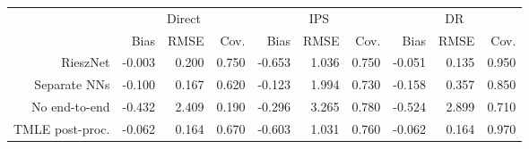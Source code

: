 \begin{tabular}{*{10}{r}} 
\toprule 
& \multicolumn{3}{c}{Direct} & \multicolumn{3}{c}{IPS} & \multicolumn{3}{c}{DR} \\ 
\cmidrule(lr){2-4} \cmidrule(lr){5-7} \cmidrule(lr){8-10} 
&  Bias &  RMSE &  Cov. &  Bias &  RMSE &  Cov. &  Bias &  RMSE &  Cov. \\ 
\midrule 
RieszNet & -0.003 & 0.200 & 0.750 & -0.653 & 1.036 & 0.750 & -0.051 & 0.135 & 0.950 \\ 
Separate NNs & -0.100 & 0.167 & 0.620 & -0.123 & 1.994 & 0.730 & -0.158 & 0.357 & 0.850 \\ 
No end-to-end & -0.432 & 2.409 & 0.190 & -0.296 & 3.265 & 0.780 & -0.524 & 2.899 & 0.710 \\ 
TMLE post-proc. & -0.062 & 0.164 & 0.670 & -0.603 & 1.031 & 0.760 & -0.062 & 0.164 & 0.970 \\ 
\bottomrule 
 \end{tabular}